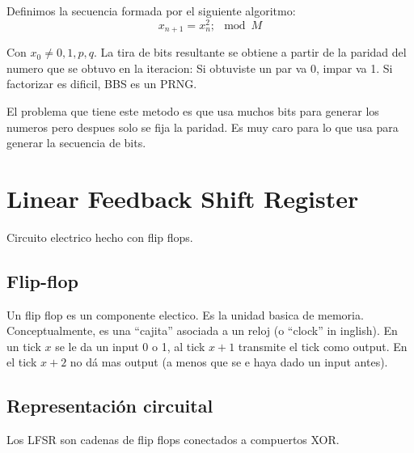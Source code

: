 \documentclass[12pt,a4paper]{report}
\begin{document}
Definimos la secuencia formada por el siguiente algoritmo:
$$
x_{n + 1} = x_n^2 ; \mod {M}
$$

Con $x_0 \neq 0,1,p,q$.
La tira de bits resultante se obtiene a partir de la paridad del numero que se obtuvo en la iteracion: Si obtuviste un par va 0, impar va 1.
Si factorizar es dificil, BBS es un PRNG.

El problema que tiene este metodo es que usa muchos bits para generar los numeros pero despues solo se fija la paridad. Es muy caro para lo que usa para generar la secuencia de bits.

\section{Linear Feedback Shift Register}
Circuito electrico hecho con flip flops.
\subsection{Flip-flop}
Un flip flop es un componente electico. Es la unidad basica de memoria. Conceptualmente, es una ``cajita'' asociada a un reloj (o ``clock'' in inglish). En un tick $x$ se le da un input 0 o 1, al tick  $x + 1$ transmite el tick como output. En el tick $x + 2$ no dá mas output (a menos que se e haya dado un input antes).

\begin{center}
\end{center}

\subsection{Representación circuital}

Los LFSR son cadenas de flip flops conectados a compuertos XOR.
\end{document}
